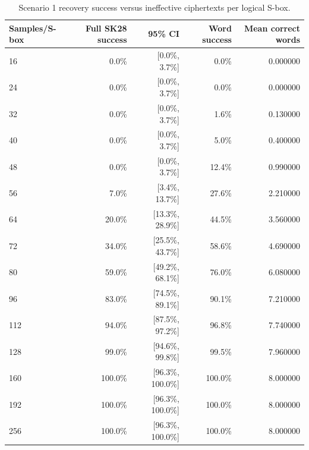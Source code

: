 \begin{table}[t]
\centering
\caption{Scenario 1 recovery success versus ineffective ciphertexts per logical S-box.}
\label{tab:s1-success-curve}
\begin{tabular}{lrrrr}
\toprule
Samples/S-box & Full SK28 success & 95\% CI & Word success & Mean correct words \\
\midrule
16 & 0.0\% & [0.0\%, 3.7\%] & 0.0\% & 0.000000 \\
24 & 0.0\% & [0.0\%, 3.7\%] & 0.0\% & 0.000000 \\
32 & 0.0\% & [0.0\%, 3.7\%] & 1.6\% & 0.130000 \\
40 & 0.0\% & [0.0\%, 3.7\%] & 5.0\% & 0.400000 \\
48 & 0.0\% & [0.0\%, 3.7\%] & 12.4\% & 0.990000 \\
56 & 7.0\% & [3.4\%, 13.7\%] & 27.6\% & 2.210000 \\
64 & 20.0\% & [13.3\%, 28.9\%] & 44.5\% & 3.560000 \\
72 & 34.0\% & [25.5\%, 43.7\%] & 58.6\% & 4.690000 \\
80 & 59.0\% & [49.2\%, 68.1\%] & 76.0\% & 6.080000 \\
96 & 83.0\% & [74.5\%, 89.1\%] & 90.1\% & 7.210000 \\
112 & 94.0\% & [87.5\%, 97.2\%] & 96.8\% & 7.740000 \\
128 & 99.0\% & [94.6\%, 99.8\%] & 99.5\% & 7.960000 \\
160 & 100.0\% & [96.3\%, 100.0\%] & 100.0\% & 8.000000 \\
192 & 100.0\% & [96.3\%, 100.0\%] & 100.0\% & 8.000000 \\
256 & 100.0\% & [96.3\%, 100.0\%] & 100.0\% & 8.000000 \\
\bottomrule
\end{tabular}
\end{table}

